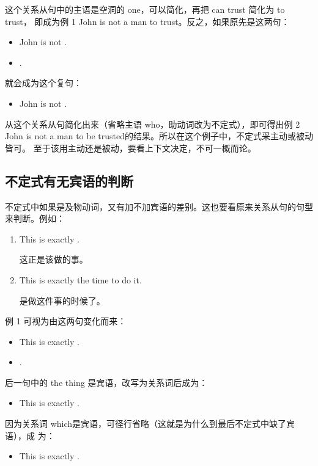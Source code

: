这个关系从句中的主语是空洞的 one，可以简化，再把 can trust 简化为 to trust，
即成为例 1 John is not a man to trust。反之，如果原先是这两句：
\begin{itemize}
\item John is not .
\item {} .
\end{itemize}
就会成为这个复句：
\begin{itemize}
\item John is not  .
\end{itemize}
从这个关系从句简化出来（省略主语 who，助动词改为不定式），即可得出例 2 John
is not a man to be trusted的结果。所以在这个例子中，不定式采主动或被动皆可。
至于该用主动还是被动，要看上下文决定，不可一概而论。

\subsection{不定式有无宾语的判断}

不定式中如果是及物动词，又有加不加宾语的差别。这也要看原来关系从句的句型来判断。例如：
\begin{enumerate}
\item This is exactly  .

  这正是该做的事。
\item   This is exactly the time to do it.

  是做这件事的时候了。
\end{enumerate}

例 1 可视为由这两句变化而来：
\begin{itemize}
\item This is exactly .
\item {}  .
\end{itemize}
后一句中的 the thing 是宾语，改写为关系词后成为：
\begin{itemize}
\item This is exactly  .
\end{itemize}
因为关系词 which是宾语，可径行省略（这就是为什么到最后不定式中缺了宾语），成
为：
\begin{itemize}
\item This is exactly  .
\end{itemize}

